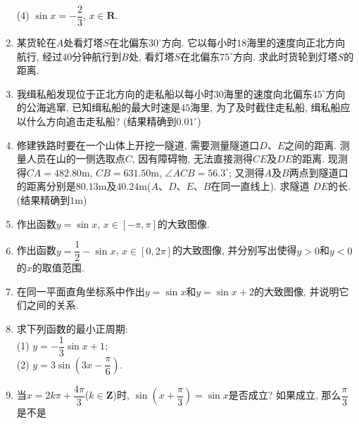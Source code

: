 \documentclass[10pt,a4paper]{article}
\begin{document}
\begin{enumerate}[1.]
(4) $\sin x=-\dfrac 23$, $x\in \mathbf{R}$. 
\item 某货轮在$A$处看灯塔$S$在北偏东$30^\circ$方向. 它以每小时$18$海里的速度向正北方向航行, 经过$40$分钟航行到$B$处, 看灯塔$S$在北偏东$75^\circ$方向. 求此时货轮到灯塔$S$的距离.
\item 我缉私船发现位于正北方向的走私船以每小时$30$海里的速度向北偏东$45^\circ$方向的公海逃窜, 已知缉私船的最大时速是$45$海里, 为了及时截住走私船, 缉私船应以什么方向追击走私船?  (结果精确到$0.01^\circ$)
\item 修建铁路时要在一个山体上开挖一隧道, 需要测量隧道口$D$、$E$之间的距离. 测量人员在山的一侧选取点$C$, 因有障碍物, 无法直接测得$CE$及$DE$的距离. 现测得$CA=482. 80\text{m}$, $CB=631.50\text{m}$, $\angle ACB=56.3^\circ$; 又测得$A$及$B$两点到隧道口的距离分别是$80.13\text{m}$及$40.24\text{m}$($A$、$D$、$E$、$B$在同一直线上). 求隧道
$DE$的长. (结果精确到$1\text{m}$)
\begin{center}
\end{center}
\item 作出函数$y=\sin x$, $x\in [-\pi , \pi ]$的大致图像.
\item 作出函数$y=\dfrac 12-\sin x$, $x\in [0, 2\pi ]$的大致图像, 并分别写出使得$y>0$和$y<0$的$x$的取值范围.
\item 在同一平面直角坐标系中作出$y=\sin x$和$y=\sin x+2$的大致图像, 并说明它们之间的关系.
\item 求下列函数的最小正周期:\\
(1) $y=-\dfrac 13\sin x+1$;\\
(2) $y=3\sin (3x-\dfrac\pi 6)$.
\item 当$x=2k\pi +\dfrac{4\pi} 3$($k\in \mathbf{Z}$)时, $\sin (x+\dfrac\pi 3)=\sin x$是否成立? 如果成立, 那么$\dfrac \pi 3$是不是

\end{enumerate}
\end{document}
